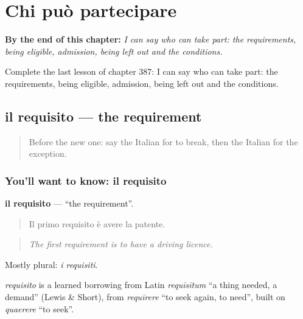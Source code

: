 
\chapter{Chi può partecipare}
\label{ch:it-chi-puo-partecipare}

\begin{chapteropening}
\textbf{By the end of this chapter:} \emph{I can say who can take part: the requirements, being eligible, admission, being left out and the conditions.}

Complete the last lesson of chapter 387: I can say who can take part: the requirements, being eligible, admission, being left out and the conditions.
\end{chapteropening}

\section[il requisito]{il requisito — the requirement}

\label{lesson:IT-C387-requisito}



\begin{quote}
Before the new one: say the Italian for to break, then the Italian for the exception.
\end{quote}

\subsection*{You'll want to know: il requisito}
\textbf{il requisito} — \textquotedblleft{}the requirement\textquotedblright{}.

\begin{quote}
Il primo requisito è avere la patente.
\end{quote}

\begin{quote}
\emph{The first requirement is to have a driving licence.}
\end{quote}

Mostly plural: \emph{i requisiti}.

\begin{cousinweb}
\emph{requisito} is a learned borrowing from Latin \emph{requīsītum} \textquotedblleft{}a thing needed, a demand\textquotedblright{} (Lewis \& Short), from \emph{requīrere} \textquotedblleft{}to seek again, to need\textquotedblright{}, built on \emph{quaerere} \textquotedblleft{}to seek\textquotedblright{}.
\end{cousinweb}

